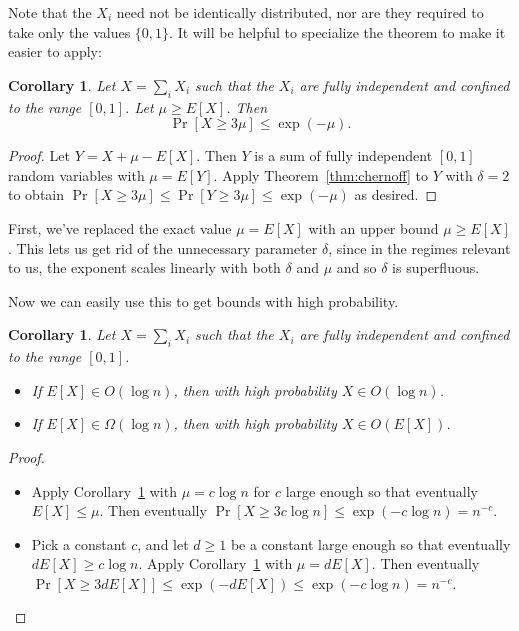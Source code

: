 \documentclass{article}
\newtheorem{corollary}[theorem]{Corollary}
\begin{document}
Note that the \(X_i\) need not be identically distributed, nor are they required to take only the values \(\{0, 1\}\).
It will be helpful to specialize the theorem to make it easier to apply:

\begin{tcolorbox}
  \begin{corollary}
    \label{cor:chernoff-simple}
    Let \(X = \sum_i X_i\) such that the \(X_i\) are fully independent and confined to the range \([0, 1]\).
    Let \(\mu \ge E[X]\).
    Then \[\Pr[X \ge 3\mu] \le \exp(-\mu).\]  
  \end{corollary}
\end{tcolorbox}
\begin{proof}
  Let \(Y = X + \mu - E[X]\).
  Then \(Y\) is a sum of fully independent \([0, 1]\) random variables with \(\mu = E[Y]\).
  Apply Theorem~\ref{thm:chernoff} to \(Y\) with \(\delta = 2\) to obtain
  \(\Pr[X \ge 3\mu] \le \Pr[Y \ge 3\mu] \le \exp(-\mu)\)
  as desired.
\end{proof}

First, we've replaced the exact value \(\mu = E[X]\) with an upper bound \(\mu \ge E[X]\).
This lets us get rid of the unnecessary parameter \(\delta\),
since in the regimes relevant to us, the exponent scales linearly with both \(\delta\) and \(\mu\)
and so \(\delta\) is superfluous.

Now we can easily use this to get bounds with high probability.

\begin{tcolorbox}
  \begin{corollary}
    Let \(X = \sum_i X_i\) such that the \(X_i\) are fully independent and confined to the range \([0, 1]\).
    \begin{itemize}
    \item If \(E[X] \in O(\log n)\), then with high probability \(X \in O(\log n)\).
    \item If \(E[X] \in \Omega(\log n)\), then with high probability \(X \in O(E[X])\).
    \end{itemize}
  \end{corollary}
\end{tcolorbox}
\begin{proof}\hfill
  \begin{itemize}
  \item
    Apply Corollary~\ref{cor:chernoff-simple} with \(\mu = c \log n\) for \(c\) large enough so that eventually \(E[X] \le \mu\).
    Then eventually \(\Pr[X \ge 3c \log n] \le \exp(-c\log n) = n^{-c}\).
  \item
    Pick a constant \(c\),
    and let \(d \ge 1\) be a constant large enough so that eventually \(dE[X] \ge c \log n\).
    Apply Corollary~\ref{cor:chernoff-simple} with \(\mu = dE[X]\).
    Then eventually \(\Pr[X \ge 3dE[X]] \le \exp(-dE[X]) \le \exp(-c\log n) = n^{-c}\).
  \end{itemize}
\end{proof}
\end{document}
